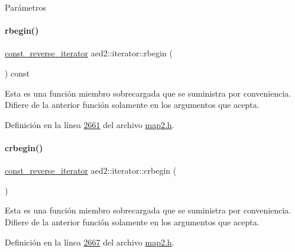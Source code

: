 \begin{DoxyParams}{\-Parámetros}
\begin{DoxyCompactItemize}
\paragraph{\texorpdfstring{rbegin()}{rbegin()}\hspace{0.1cm}{\footnotesize\ttfamily [2/2]}}
{\footnotesize\ttfamily \hyperlink{classaed2_1_1iterator_a657402896e5b5966660032f5686cc4c4_a657402896e5b5966660032f5686cc4c4}{const\+\_\+reverse\+\_\+iterator} aed2\+::iterator\+::rbegin (\begin{DoxyParamCaption}{ }\end{DoxyParamCaption}) const\hspace{0.3cm}{\ttfamily [inline]}}

Esta es una función miembro sobrecargada que se suministra por conveniencia. Difiere de la anterior función solamente en los argumentos que acepta. 

Definición en la línea \hyperlink{map2_8h_source_l02661}{2661} del archivo \hyperlink{map2_8h_source}{map2.\+h}.

\mbox{\label{classaed2_1_1iterator_aa4b6ce667258581859351db42cfd3ee4_aa4b6ce667258581859351db42cfd3ee4}} 
\paragraph{\texorpdfstring{crbegin()}{crbegin()}}
{\footnotesize\ttfamily \hyperlink{classaed2_1_1iterator_a657402896e5b5966660032f5686cc4c4_a657402896e5b5966660032f5686cc4c4}{const\+\_\+reverse\+\_\+iterator} aed2\+::iterator\+::crbegin (\begin{DoxyParamCaption}{ }\end{DoxyParamCaption})\hspace{0.3cm}{\ttfamily [inline]}}

Esta es una función miembro sobrecargada que se suministra por conveniencia. Difiere de la anterior función solamente en los argumentos que acepta. 

Definición en la línea \hyperlink{map2_8h_source_l02667}{2667} del archivo \hyperlink{map2_8h_source}{map2.\+h}.

\mbox{\label{classaed2_1_1iterator_a0007a7962bc6aca8dca78c2a49bd581d_a0007a7962bc6aca8dca78c2a49bd581d}} 

\end{DoxyCompactItemize}
\end{DoxyParams}
